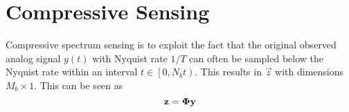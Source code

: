 \section{Compressive Sensing}
Compressive spectrum sensing is to exploit the fact that the original observed analog signal $y(t)$ with Nyquist rate $1/T$ can often be sampled below the Nyquist rate within an interval $t\in \left[0,N_{b}t \right)$. This results in $\vec{z}$ with dimensions $M_b \times 1$. This can be seen as 
\begin{equation}
    \label{nonuniformsampling}
    \boldsymbol{\mathbf{z}} = \boldsymbol{\mathbf{\Phi}}\boldsymbol{\mathbf{y}}
\end{equation}
